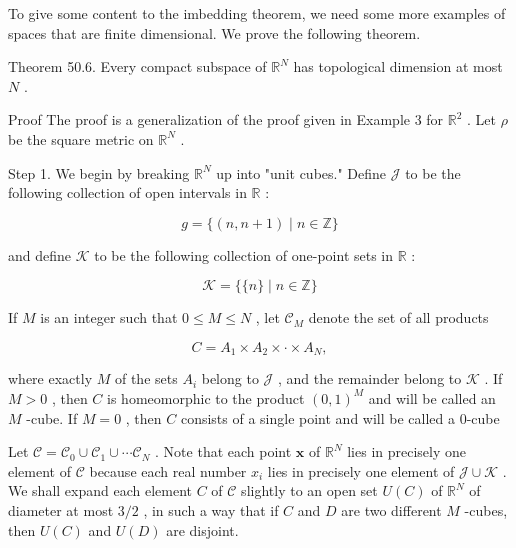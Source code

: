 \documentclass[10pt]{article}
\begin{document}
To give some content to the imbedding theorem, we need some more examples of spaces that are finite dimensional. We prove the following theorem.

Theorem 50.6. Every compact subspace of \({\mathbb{R}}^{N}\) has topological dimension at most \(N\) .

Proof The proof is a generalization of the proof given in Example 3 for \({\mathbb{R}}^{2}\) . Let \(\rho\) be the square metric on \({\mathbb{R}}^{N}\) .

Step 1. We begin by breaking \({\mathbb{R}}^{N}\) up into "unit cubes." Define \(\mathcal{J}\) to be the following collection of open intervals in \(\mathbb{R}\) :

\[
g = \{ \left( {n,n + 1}\right)  \mid  n \in  \mathbb{Z}\}
\]

and define \(\mathcal{K}\) to be the following collection of one-point sets in \(\mathbb{R}\) :

\[
\mathcal{K} = \{ \{ n\}  \mid  n \in  \mathbb{Z}\}
\]

If \(M\) is an integer such that \(0 \leq  M \leq  N\) , let \({\mathcal{C}}_{M}\) denote the set of all products

\[
C = {A}_{1} \times  {A}_{2} \times   \cdot   \times  {A}_{N},
\]

where exactly \(M\) of the sets \({A}_{i}\) belong to \(\mathcal{J}\) , and the remainder belong to \(\mathcal{K}\) . If \(M > 0\) , then \(C\) is homeomorphic to the product \({\left( 0,1\right) }^{M}\) and will be called an \(M\) -cube. If \(M = 0\) , then \(C\) consists of a single point and will be called a 0-cube

Let \(\mathcal{C} = {\mathcal{C}}_{0} \cup  {\mathcal{C}}_{1} \cup  \cdots {\mathcal{C}}_{N}\) . Note that each point \(\mathbf{x}\) of \({\mathbb{R}}^{N}\) lies in precisely one element of \(\mathcal{C}\) because each real number \({x}_{i}\) lies in precisely one element of \(\mathcal{J} \cup  \mathcal{K}\) . We shall expand each element \(C\) of \(\mathcal{C}\) slightly to an open set \(U\left( C\right)\) of \({\mathbb{R}}^{N}\) of diameter at most \(3/2\) , in such a way that if \(C\) and \(D\) are two different \(M\) -cubes, then \(U\left( C\right)\) and \(U\left( D\right)\) are disjoint.
\end{document}
